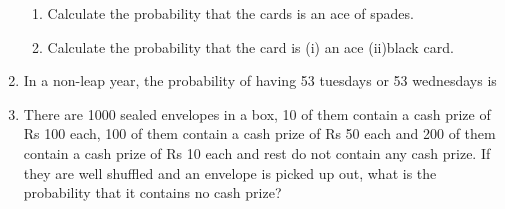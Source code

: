 \begin{enumerate}[label=\thesection.\arabic*,ref=\thesection.\theenumi]
\begin{enumerate}[label=(\alph*)]
\item Calculate the probability that the cards is an ace of spades.
\item Calculate the probability that the card is (i) an ace (ii)black card.\\
\end{enumerate}

\item In a non-leap year, the probability of having 53 tuesdays or 53 wednesdays is\\
\solution

\item There are 1000 sealed envelopes in a box, 10 of them contain a cash prize of
Rs 100 each, 100 of them contain a cash prize of Rs 50 each and 200 of them
contain a cash prize of Rs 10 each and rest do not contain any cash prize. If they
are well shuffled and an envelope is picked up out, what is the probability that it
contains no cash prize?\\
\solution

\end{enumerate}
